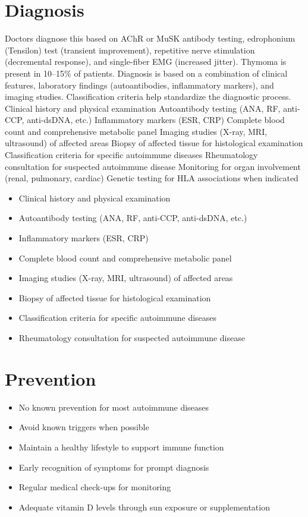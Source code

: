 \section{Diagnosis}
Doctors diagnose this based on AChR or MuSK antibody testing, edrophonium (Tensilon) test (transient improvement), repetitive nerve stimulation (decremental response), and single-fiber EMG (increased jitter). Thymoma is present in 10--15\% of patients. Diagnosis is based on a combination of clinical features, laboratory findings (autoantibodies, inflammatory markers), and imaging studies. Classification criteria help standardize the diagnostic process. Clinical history and physical examination Autoantibody testing (ANA, RF, anti-CCP, anti-dsDNA, etc.) Inflammatory markers (ESR, CRP) Complete blood count and comprehensive metabolic panel Imaging studies (X-ray, MRI, ultrasound) of affected areas Biopsy of affected tissue for histological examination Classification criteria for specific autoimmune diseases Rheumatology consultation for suspected autoimmune disease Monitoring for organ involvement (renal, pulmonary, cardiac) Genetic testing for HLA associations when indicated

\begin{itemize}[noitemsep]
  \item Clinical history and physical examination
  \item Autoantibody testing (ANA, RF, anti-CCP, anti-dsDNA, etc.)
  \item Inflammatory markers (ESR, CRP)
  \item Complete blood count and comprehensive metabolic panel
  \item Imaging studies (X-ray, MRI, ultrasound) of affected areas
  \item Biopsy of affected tissue for histological examination
  \item Classification criteria for specific autoimmune diseases
  \item Rheumatology consultation for suspected autoimmune disease
\end{itemize}
\section{Prevention}
\begin{itemize}[noitemsep]
  \item No known prevention for most autoimmune diseases
  \item Avoid known triggers when possible
  \item Maintain a healthy lifestyle to support immune function
  \item Early recognition of symptoms for prompt diagnosis
  \item Regular medical check-ups for monitoring
  \item Adequate vitamin D levels through sun exposure or supplementation
\end{itemize}
